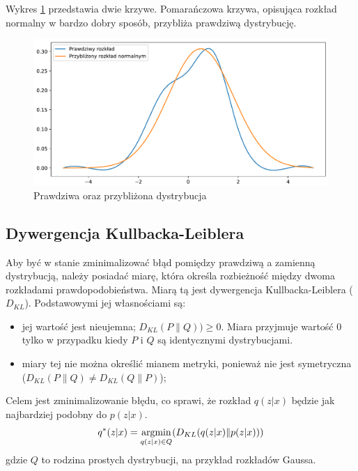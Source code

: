 \documentclass[a4paper,12pt,oneside]{book} %
\begin{document}
Wykres \ref{fig:app} przedstawia dwie krzywe. Pomarańczowa krzywa, opisująca rozkład normalny w bardzo dobry sposób, przybliża prawdziwą dystrybucję.
\begin{figure}[h!]
	\centering
	\includegraphics[width=12cm]{approximate.pdf}
	\caption{Prawdziwa oraz przybliżona dystrybucja}
		\label{fig:app}
\end{figure} 

\subsection{Dywergencja Kullbacka-Leiblera}
Aby być w stanie zminimalizować błąd pomiędzy prawdziwą a zamienną dystrybucją, należy posiadać miarę, która określa rozbieżność między dwoma rozkładami prawdopodobieństwa. Miarą tą jest dywergencja Kullbacka-Leiblera ($D_{KL}$). Podstawowymi jej własnościami są:
\begin{itemize}
	\item jej wartość jest nieujemna; $D_{KL}(P\|Q)) \geq 0$. Miara przyjmuje wartość 0 tylko w przypadku kiedy $P$ i $Q$ są identycznymi dystrybucjami.
	\item miary tej nie można określić mianem metryki, ponieważ nie jest symetryczna ($D_{KL}(P\|Q)\neq D_{KL}(Q\|P)$);
\end{itemize}
Celem jest zminimalizowanie błędu, co sprawi, że rozkład $q(z|x)$ będzie jak najbardziej podobny do $p(z|x)$.
\begin{equation}
	q^\ast(z|x)=\operatorname*{argmin}_{q(z|x)\in Q}(D_{KL}(q(z|x)\|p(z|x)))\\
		\label{qopt}
\end{equation}
gdzie $Q$ to rodzina prostych dystrybucji, na przykład rozkładów Gaussa.
\end{document}
